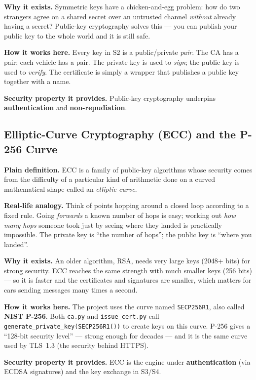 \documentclass[11pt,a4paper]{article}
\begin{document}
\textbf{Why it exists.} Symmetric keys have a chicken-and-egg problem: how do two
strangers agree on a shared secret over an untrusted channel \emph{without}
already having a secret? Public-key cryptography solves this --- you can publish
your public key to the whole world and it is still safe.

\textbf{How it works here.} Every key in S2 is a public/private \emph{pair}. The
CA has a pair; each vehicle has a pair. The private key is used to \emph{sign};
the public key is used to \emph{verify}. The certificate is simply a wrapper
that publishes a public key together with a name.

\textbf{Security property it provides.} Public-key cryptography underpins
\textbf{authentication} and \textbf{non-repudiation}.

\subsection{Elliptic-Curve Cryptography (ECC) and the P-256 Curve}
\textbf{Plain definition.} ECC is a family of public-key algorithms whose
security comes from the difficulty of a particular kind of arithmetic done on a
curved mathematical shape called an \emph{elliptic curve}.

\textbf{Real-life analogy.} Think of points hopping around a closed loop
according to a fixed rule. Going \emph{forwards} a known number of hops is easy;
working out \emph{how many hops} someone took just by seeing where they landed
is practically impossible. The private key is ``the number of hops''; the public
key is ``where you landed''.

\textbf{Why it exists.} An older algorithm, RSA, needs very large keys (2048+
bits) for strong security. ECC reaches the same strength with much smaller keys
(256 bits) --- so it is faster and the certificates and signatures are smaller,
which matters for cars sending messages many times a second.

\textbf{How it works here.} The project uses the curve named \texttt{SECP256R1},
also called \textbf{NIST P-256}. Both \texttt{ca.py} and \texttt{issue\_cert.py}
call \texttt{generate\_private\_key(SECP256R1())} to create keys on this curve.
P-256 gives a ``128-bit security level'' --- strong enough for decades --- and
it is the same curve used by TLS~1.3 (the security behind HTTPS).

\textbf{Security property it provides.} ECC is the engine under
\textbf{authentication} (via ECDSA signatures) and the key exchange in S3/S4.
\end{document}
